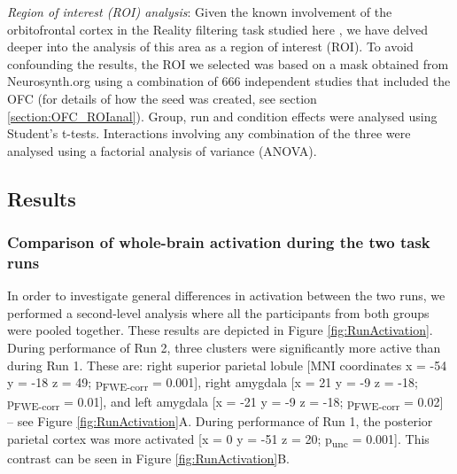 \textit{Region of interest (ROI) analysis}: Given the known involvement of the orbitofrontal cortex in the Reality filtering task studied here \citep{Schnider2018, Liverani2020}, we have delved deeper into the analysis of this area as a region of interest (ROI). To avoid confounding the results, the ROI we selected was based on a mask obtained from Neurosynth.org using a combination of 666 independent studies that included the OFC (for details of how the seed was created, see section \ref{section:OFC_ROIanal}). Group, run and condition effects were analysed using Student's t-tests. Interactions involving any combination of the three were analysed using a factorial analysis of variance (ANOVA).

\vspace{1cm}
\subsection{Results}

\subsubsection{Comparison of whole-brain activation during the two task runs}
In order to investigate general differences in activation between the two runs, we performed a second-level analysis where all the participants from both groups were pooled together. These results are depicted in Figure \ref{fig:RunActivation}. During performance of Run 2, three clusters were significantly more active than during Run 1. These are: right superior parietal lobule [MNI coordinates x = -54 y = -18 z = 49; p\textsubscript{FWE-corr} = 0.001], right amygdala [x = 21 y = -9 z = -18; p\textsubscript{FWE-corr} = 0.01], and left amygdala [x = -21 y = -9 z = -18; p\textsubscript{FWE-corr} = 0.02] – see Figure  \ref{fig:RunActivation}A. During performance of Run 1, the posterior parietal cortex was more activated [x = 0 y = -51 z = 20; p\textsubscript{unc} = 0.001]. This contrast can be seen in Figure \ref{fig:RunActivation}B.


